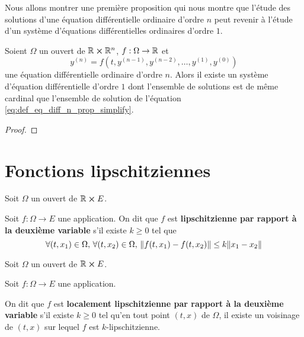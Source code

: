 \documentclass[a4paper, 11pt]{report}
\begin{document}
	Nous allons montrer une première proposition qui nous montre que l'étude des
	solutions d'une équation différentielle ordinaire d'ordre $n$ peut revenir à
	l'étude d'un système d'équations différentielles ordinaires d'ordre $1$.

	\begin{proposition}
		Soient $\Omega$ un ouvert de $\mathbb{R} \cross \mathbb{R}^{n}$, $f :
		\Omega \rightarrow \mathbb{R}$ et
		\begin{equation}
			y^{(n)} = f(t, y^{(n - 1)}, y^{(n - 2)}, \dots, y^{(1)}, y^{(0)})
			\label{eq:def_eq_diff_n_prop_simplify}
		\end{equation}
		une équation différentielle ordinaire d'ordre $n$.
		Alors il existe un système d'équation différentielle d'ordre $1$ dont
		l'ensemble de solutions est de même cardinal que l'ensemble de solution
		de l'équation \ref{eq:def_eq_diff_n_prop_simplify}.
	\end{proposition}

	\ifdefined\outputproof
	\begin{proof}

	\end{proof}
	\fi

\section{Fonctions lipschitziennes}

	\begin{definition} [Lipschitzienne]
		Soit $\Omega$ un ouvert de $\mathbb{R} \cross E$.

		Soit $f : \Omega \rightarrow E$ une application.
		On dit que $f$ est \textbf{lipschitzienne par rapport à la deuxième
		variable} s'il existe $k \geq 0$ tel que
		\begin{equation}
			\forall (t, x_{1}) \in \Omega, \, \forall (t, x_{2}) \in \Omega, \,
			\norm{f(t, x_{1}) - f(t, x_{2})} \leq k \norm{x_{1} - x_{2}}
		\end{equation}
	\end{definition}

	\begin{definition}
		Soit $\Omega$ un ouvert de $\mathbb{R} \cross E$.

		Soit $f : \Omega \rightarrow E$ une application.

		On dit que $f$ est \textbf{localement lipschitzienne par rapport à la
		deuxième variable} s'il existe $k \geq 0$ tel qu'en tout point $(t, x)$ de $\Omega$, il existe un
		voisinage de $(t, x)$ sur lequel $f$ est $k$-lipschitzienne.
	\end{definition}
\end{document}
